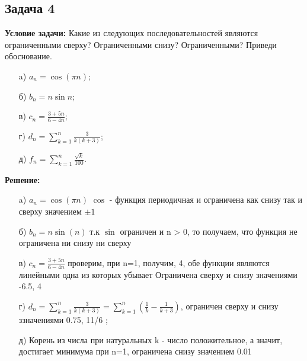 \documentclass[a4paper,12pt]{article}
\begin{document}
\subsection{Задача 4}
\textbf{Условие задачи:}
Какие из следующих последовательностей являются ограниченными сверху? Ограниченными снизу? Ограниченными? Приведи обоснование.
\begin{itemize}
    \item[a)] \(a_n = \cos(\pi n)\);
    \item[б)] \(b_n = n \sin n\);
    \item[в)] \(c_n = \frac{3 + 5n}{6 - 4n}\);
    \item[г)] \(d_n = \sum_{k=1}^{n} \frac{3}{k(k+3)}\);
    \item[д)] \(f_n = \sum_{k=1}^{n} \frac{\sqrt{k}}{100}\).
\end{itemize}
\textbf{Решение:}
\begin{itemize}
    \item[a)] $a_n = \cos(\pi n)$ $\cos$ - функция периодичная и ограничена как снизу так и сверху значением $\pm 1$
    \item[б)] $b_n = n \sin(n)$ т.к $\sin$ ограничен и n > 0, то получаем, что функция не ограничена ни снизу ни сверху
    \item[в)] $c_n = \frac{3+5n}{6-4n}$ проверим, при n=1, получим, 4, обе функции являются линейными одна из которых убывает Ограничена сверху и снизу значениями -6.5, 4
    \item[г)] \(d_n = \sum_{k=1}^{n} \frac{3}{k(k+3)}=\sum_{k=1}^{n}(\frac{1}{k}-\frac{1}{k+3})\), ограничен сверху и снизу ззначениями 0.75, 11/6 ;

    \item[д)] Корень из числа при натуральных k - число положительное, а значит, достигает минимума при n=1, ограничена снизу значением 0.01
\end{itemize}
\vspace{1cm}
\end{document}
